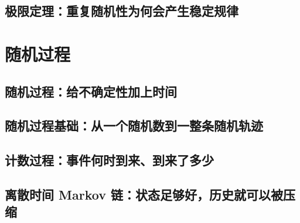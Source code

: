 \documentclass[UTF8,openany]{ctexbook}
\theoremstyle{definition}
\theoremstyle{plain}
\begin{document}
\chapter*{极限定理：重复随机性为何会产生稳定规律}
\label{ch:044}






\clearpage
\part{随机过程}
\chapter*{随机过程：给不确定性加上时间}
\label{ch:045}

\clearpage
\chapter*{随机过程基础：从一个随机数到一整条随机轨迹}
\label{ch:046}




\clearpage
\chapter*{计数过程：事件何时到来、到来了多少}
\label{ch:047}





\clearpage
\chapter*{离散时间 Markov 链：状态足够好，历史就可以被压缩}
\label{ch:048}






\clearpage
\end{document}
